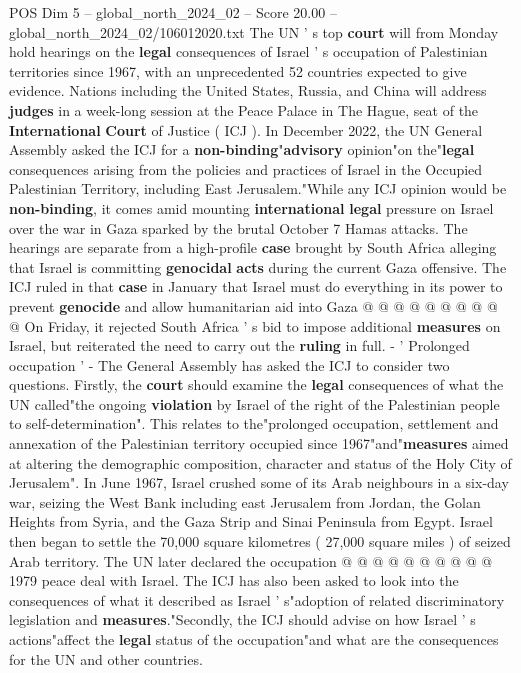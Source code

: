 \begin{textsample}{POS Dim 5 – global\_north\_2024\_02 – Score 20.00 – global\_north\_2024\_02/106012020.txt}  \label{ex:f5_pos_244}
The UN ' s top \textbf{court} will from Monday hold hearings on the \textbf{legal} consequences of Israel ' s occupation of Palestinian territories since 1967, with an unprecedented 52 countries expected to give evidence.
Nations including the United States, Russia, and China will address \textbf{judges} in a week-long session at the Peace Palace in The Hague, seat of the \textbf{International} \textbf{Court} of Justice ( ICJ ).
In December 2022, the UN General Assembly asked the ICJ for a \textbf{non-binding}"\textbf{advisory} opinion"on the"\textbf{legal} consequences arising from the policies and practices of Israel in the Occupied Palestinian Territory, including East Jerusalem."While any ICJ opinion would be \textbf{non-binding}, it comes amid mounting \textbf{international} \textbf{legal} pressure on Israel over the war in Gaza sparked by the brutal October 7 Hamas attacks.
The hearings are separate from a high-profile \textbf{case} brought by South Africa alleging that Israel is committing \textbf{genocidal} \textbf{acts} during the current Gaza offensive.
The ICJ ruled in that \textbf{case} in January that Israel must do everything in its power to prevent \textbf{genocide} and allow humanitarian aid into Gaza @ @ @ @ @ @ @ @ @ @ On Friday, it rejected South Africa ' s bid to impose additional \textbf{measures} on Israel, but reiterated the need to carry out the \textbf{ruling} in full. - ' Prolonged occupation ' - The General Assembly has asked the ICJ to consider two questions.
Firstly, the \textbf{court} should examine the \textbf{legal} consequences of what the UN called"the ongoing \textbf{violation} by Israel of the right of the Palestinian people to self-determination".
This relates to the"prolonged occupation, settlement and annexation of the Palestinian territory occupied since 1967"and"\textbf{measures} aimed at altering the demographic composition, character and status of the Holy City of Jerusalem".
In June 1967, Israel crushed some of its Arab neighbours in a six-day war, seizing the West Bank including east Jerusalem from Jordan, the Golan Heights from Syria, and the Gaza Strip and Sinai Peninsula from Egypt.
Israel then began to settle the 70,000 square kilometres ( 27,000 square miles ) of seized Arab territory.
The UN later declared the occupation @ @ @ @ @ @ @ @ @ @ 1979 peace deal with Israel.
The ICJ has also been asked to look into the consequences of what it described as Israel ' s"adoption of related discriminatory legislation and \textbf{measures}."Secondly, the ICJ should advise on how Israel ' s actions"affect the \textbf{legal} status of the occupation"and what are the consequences for the UN and other countries.

\end{textsample}
